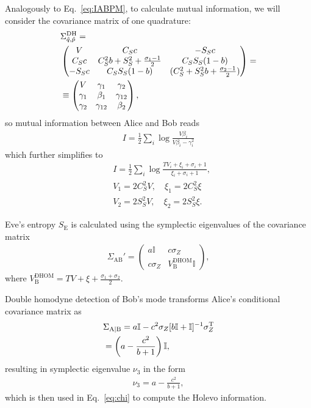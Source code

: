 \documentclass[%
reprint,
superscriptaddress,
 amsmath,amssymb,amsfonts,
 aps,
 pra,
 longbibliography
]{revtex4-2}
\newcommand{\ind}[1]{\mathrm{#1}}
\begin{document}
Analogously to Eq.~\eqref{eq:IABPM}, to calculate mutual information, 
we will consider the covariance matrix of one quadrature:
\begin{align}
  \label{eq:sigma_qp_dhom}
    &\Sigma_{\hat{q}, \hat{p}}^{\ind{DH}}=\notag\\
    &\begin{pmatrix}
        V&C_Sc&-S_Sc\\
        C_Sc&C_S^2b+S_S^2+\frac{\sigma_1-1}{2}&C_SS_S(1-b)\\
        -S_Sc&C_SS_S(1-b)&(C_S^2+S_S^2b+\frac{\sigma_2-1}{2})
    \end{pmatrix}=\\
    &\equiv 
    \begin{pmatrix}
        V&\gamma_1&\gamma_2\\
        \gamma_1&\beta_1&\gamma_{12}\\
        \gamma_2&\gamma_{12}&\beta_2
    \end{pmatrix}
    ,
\end{align}
so mutual information between Alice and Bob reads
\begin{align}
  \label{eq:I_hom}
    I=\frac{1}{2}\sum_i
    \log\frac{V \beta_i}{V\beta_i-\gamma_i^2}
\end{align}
which further simplifies to
\begin{align}
  \label{eq:I_hom_final}
    &I=\frac{1}{2}\sum_i\log \frac{TV_i+\xi_i+\sigma_i+1}{\xi_i+\sigma_i+1}, \\
    &V_1=2C_S^2V,\quad \xi_1=2C_S^2\xi\\
    &V_2=2S_S^2V,\quad \xi_2=2S_S^2\xi.
\end{align}

Eve's entropy $S_{\ind{E}}$ is calculated using the symplectic eigenvalues of the covariance matrix
\begin{align}
\label{eq:Sigma_AB_dhom}
    \Sigma_{\ind{AB}}'=\begin{pmatrix}
        a\mathbb{I}&c\sigma_Z\\
        c\sigma_Z&V_{\ind{B}}^{\ind{DHOM}}\mathbb{I}
    \end{pmatrix},
\end{align}
where $V_{\ind{B}}^{\ind{DHOM}}=TV+\xi+\frac{\sigma_1+\sigma_2}{2}$.

Double homodyne detection of Bob’s mode transforms Alice’s conditional covariance matrix as
\begin{align}
    \label{eq:AB_dhom}&\Sigma_{\ind{A}|\ind{B}}=
    a\mathbb{I}-c^2\sigma_Z[b\mathbb{I}+\mathbb{I}]^{-1}\sigma_Z^{\ind T}\notag\\&=\left(a-\frac{c^2}{b+1}\right)\mathbb{I},
\end{align}
resulting in symplectic eigenvalue $\nu_3$ in the form
\begin{align}
    \nu_3=a-\frac{c^2}{b+1},
\end{align}
which is then used in Eq.~\eqref{eq:chi} to compute the Holevo information.
\end{document}
